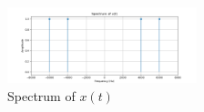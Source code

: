 \begin{figure}[h]
    \centering
    \includegraphics[width=0.49\textwidth]{fig/ex1_a_plot}
    \caption{Spectrum of \(x(t)\)}
    \label{fig:ex1_a_plot}
\end{figure}
